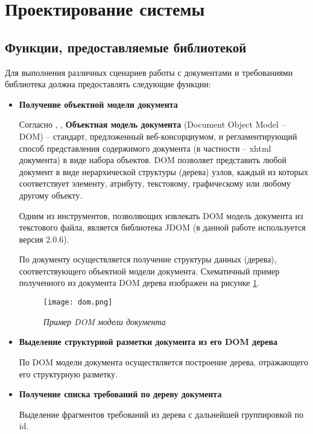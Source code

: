 \section{Проектирование системы}
\label{sec:Chapter3} 
\subsection{Функции, предоставляемые библиотекой}

Для выполнения различных сценариев работы с документами и требованиями библиотека должна предоставлять следующие функции:

\begin{itemize}
\item \textbf{Получение объектной модели документа}

Согласно \cite{book:DOM}, \cite{book:JDOM}, \textbf{Объектная модель документа} (Document Object Model – DOM) – стандарт, предложенный веб-консорциумом, и регламентирующий способ представления содержимого документа (в частности – xhtml документа) в виде набора объектов. DOM позволяет представить любой документ в виде иерархической структуры (дерева) узлов, каждый из которых соответствует элементу, атрибуту, текстовому, графическому или любому другому объекту.

Одним из инструментов, позволяющих извлекать DOM модель документа из текстового файла, является библиотека JDOM (в данной работе используется версия 2.0.6).

По документу осуществляется получение структуры данных (дерева), соответствующего объектной модели документа. Схематичный пример полученного из документа DOM дерева изображен на рисунке \ref{pr:image4}.

\begin{figure}[h]
\begin{center}
\texttt{[image: dom.png]}
\caption{\emph{Пример DOM модели документа}}
\label{pr:image4}
\end{center}
\end{figure}

\item \textbf{Выделение структурной разметки документа из его DOM дерева}

По DOM модели документа осуществляется построение дерева, отражающего его структурную разметку.

\item \textbf{Получение списка требований по дереву документа}

Выделение фрагментов требований из дерева с дальнейшей группировкой по id. 


\end{itemize}
